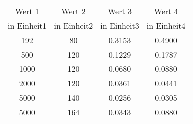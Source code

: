 

\begin{center}
\begin{tabular}{|c|c|c|c|}
\hline
Wert 1 & Wert 2 & Wert 3 & Wert 4\\
in Einheit1 & in Einheit2 & in Einheit3 & in Einheit4 \\
\hline
192 & 80& 0.3153 & 0.4900\\
500 & 120& 0.1229& 0.1787\\
1000 & 120& 0.0680& 0.0880\\
2000 & 120& 0.0361& 0.0441\\
5000 & 140& 0.0256& 0.0305\\
5000 & 164& 0.0343& 0.0880\\
\hline
\end{tabular}
\label{tab:table1}
\end{center}

\blindtext[3]